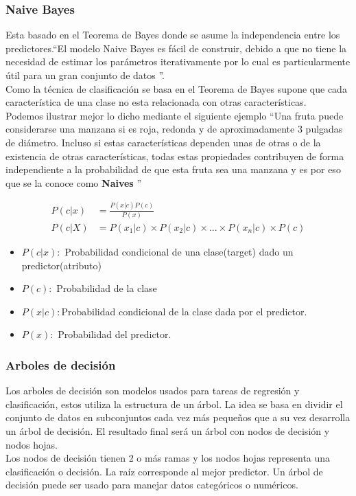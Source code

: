 \subsubsection*{Naive Bayes}
Esta basado en el Teorema de Bayes donde se asume la independencia entre los predictores.\textquotedblleft El modelo Naive Bayes es fácil de construir, debido a que no tiene la necesidad de estimar los parámetros iterativamente por lo cual es particularmente útil para un gran conjunto de datos \textquotedblright \cite{WEBSITE:8}.\\
Como la  técnica de clasificación se basa en el Teorema de Bayes supone que cada característica de una clase no esta relacionada con otras características.\\ Podemos ilustrar mejor lo dicho mediante el siguiente ejemplo  \textquotedblleft Una fruta puede considerarse una manzana si es roja, redonda y de aproximadamente 3 pulgadas de diámetro. Incluso si estas características dependen unas de otras o de la existencia de otras características, todas estas propiedades contribuyen de forma independiente a la probabilidad de que esta fruta sea una manzana y es por eso que se la conoce como \textbf{Naives}  \textquotedblright \cite{WEBSITE:4}


\begin{equation}
  \label{eq:naives}
  \begin{aligned}
  P(c|x)&=\frac{P(x|c)P(c)}{P(x)}\\
  P(c|X)&=P(x_{1}|c)\times P(x_{2}|c)\times ... \times P(x_{n}|c)\times P(c)
  \end{aligned}
\end{equation}

\begin{itemize}
	\item $P(c|x):$ Probabilidad condicional de una clase(target) dado un predictor(atributo)
	\item $P(c):$ Probabilidad de la clase
	\item $P(x|c):$Probabilidad condicional de la clase dada por el predictor.
	\item $P(x):$ Probabilidad del predictor.
	
\end{itemize}

\subsubsection*{Arboles de decisión}
Los arboles de decisión son modelos usados para tareas de regresión y clasificación, estos utiliza la estructura de un árbol. La idea se basa en dividir el conjunto de datos en subconjuntos cada vez más pequeños que a su vez desarrolla un árbol de decisión. El resultado final será un árbol con nodos de decisión y nodos hojas.\\
Los nodos de decisión tienen 2 o más ramas y los nodos hojas representa una clasificación o decisión. La raíz corresponde al mejor predictor. Un árbol de decisión puede ser usado para manejar datos categóricos o numéricos.\\

